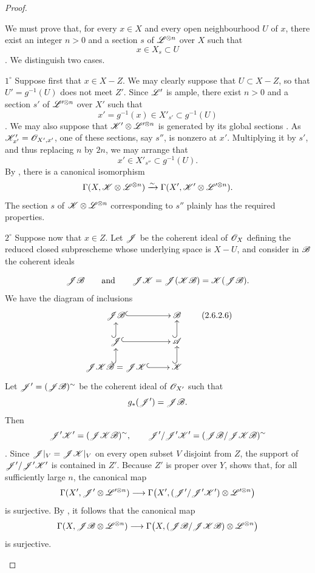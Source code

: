 \begin{proof}
\begin{env}[2.6.2.5]
We must prove that, for every $x\in X$ and every open neighbourhood $U$
of $x$, there exist an integer $n>0$ and a section $s$ of
$\mathscr{L}^{\otimes n}$ over $X$ such that
\[
  x\in X_s\subset U
\]
.
We distinguish two cases.

\smallskip
\noindent
$1^\circ$ Suppose first that $x\in X-Z$.
We may clearly suppose that $U\subset X-Z$, so that
$U'=g^{-1}(U)$ does not meet $Z'$.
Since $\mathscr{L}'$ is ample, there exist $n>0$ and a section $s'$ of
$\mathscr{L}'^{\otimes n}$ over $X'$ such that
\[
  x'=g^{-1}(x)\in X'_{s'}\subset g^{-1}(U)
\]
.
We may also suppose that
$\mathscr{K}'\otimes\mathscr{L}'^{\otimes n}$ is generated by its global sections
.
As $\mathscr{K}'_{x'}=\mathscr{O}_{X',x'}$, one of these sections, say $s''$, is
nonzero at $x'$.
Multiplying it by $s'$, and thus replacing $n$ by $2n$, we may arrange
that
\[
  x'\in X'_{s''}\subset g^{-1}(U).
\]
By , there is a canonical isomorphism
\[
  \Gamma(X,\mathscr{K}\otimes\mathscr{L}^{\otimes n})
  \xrightarrow{\sim}
  \Gamma(X',\mathscr{K}'\otimes\mathscr{L}'^{\otimes n}).
\]
The section $s$ of $\mathscr{K}\otimes\mathscr{L}^{\otimes n}$ corresponding to
$s''$ plainly has the required properties.

\smallskip
\noindent
$2^\circ$ Suppose now that $x\in Z$.
Let $\mathscr{J}$ be the coherent ideal of $\mathscr{O}_X$ defining the reduced
closed subprescheme whose underlying space is $X-U$, and consider in
$\mathscr{B}$ the coherent ideals


\[
  \mathscr{J}\mathscr{B}
  \qquad\text{and}\qquad
  \mathscr{J}\mathscr{K}
  =
  \mathscr{J}(\mathscr{K}\mathscr{B})
  =
  \mathscr{K}(\mathscr{J}\mathscr{B}).
\]
We have the diagram of inclusions
\[
  \xymatrix@R=1.5em{
    \sh{J}\sh{B}\ar@{^{(}->}[r] &
    \sh{B}\\
    \sh{J}\ar@{^{(}->}[r]\ar@{^{(}->}[u] &
    \sh{A}\ar@{^{(}->}[u]\\
    \sh{J}\sh{K}\sh{B}=\sh{J}\sh{K}
      \ar@{^{(}->}[r]\ar@{^{(}->}[u] &
    \sh{K}\ar@{^{(}->}[u]
  }
  \label{III.2.6.2.6}\tag{2.6.2.6}
\]
Let $\mathscr{J}'=(\mathscr{J}\mathscr{B})^\sim$ be the coherent ideal of
$\mathscr{O}_{X'}$ such that
\[
  g_*(\mathscr{J}')=\mathscr{J}\mathscr{B}.
\]
Then
\[
  \mathscr{J}'\mathscr{K}'=(\mathscr{J}\mathscr{K}\mathscr{B})^\sim,
  \qquad
  \mathscr{J}'/\mathscr{J}'\mathscr{K}'
  =
  (\mathscr{J}\mathscr{B}/\mathscr{J}\mathscr{K}\mathscr{B})^\sim
\]
.
Since $\mathscr{J}|_V=\mathscr{J}\mathscr{K}|_V$ on every open subset $V$ disjoint
from $Z$, the support of $\mathscr{J}'/\mathscr{J}'\mathscr{K}'$ is contained in
$Z'$.
Because $Z'$ is proper over $Y$,  shows that, for all
sufficiently large $n$, the canonical map
\[
  \Gamma(X',\mathscr{J}'\otimes\mathscr{L}'^{\otimes n})
  \longrightarrow
  \Gamma\bigl(
    X',
    (\mathscr{J}'/\mathscr{J}'\mathscr{K}')\otimes\mathscr{L}'^{\otimes n}
  \bigr)
\]
is surjective.
By , it follows that the canonical map
\[
  \Gamma(X,\mathscr{J}\mathscr{B}\otimes\mathscr{L}^{\otimes n})
  \longrightarrow
  \Gamma\bigl(
    X,
    (\mathscr{J}\mathscr{B}/\mathscr{J}\mathscr{K}\mathscr{B})
      \otimes\mathscr{L}^{\otimes n}
  \bigr)
\]
is surjective.


\end{env}
\end{proof}
